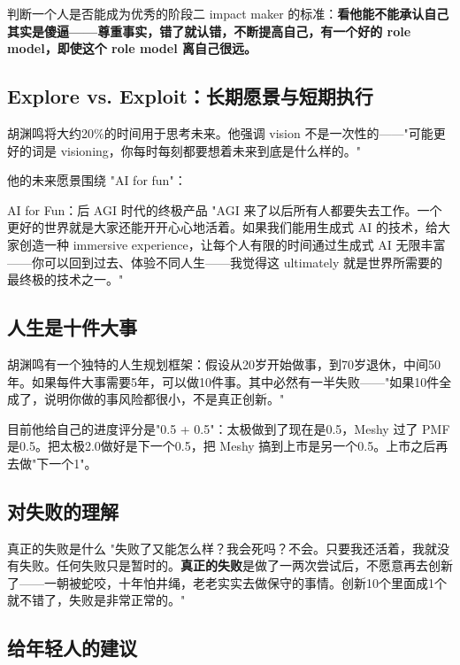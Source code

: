 \documentclass[a4paper]{article}
\begin{document}
判断一个人是否能成为优秀的阶段二 impact maker 的标准：\textbf{看他能不能承认自己其实是傻逼——尊重事实，错了就认错，不断提高自己，有一个好的 role model，即使这个 role model 离自己很远。}

\subsection{Explore vs. Exploit：长期愿景与短期执行}

胡渊鸣将大约20\%的时间用于思考未来。他强调 vision 不是一次性的——"可能更好的词是 visioning，你每时每刻都要想着未来到底是什么样的。"

他的未来愿景围绕 "AI for fun"：

\begin{knowledgebox}{AI for Fun：后 AGI 时代的终极产品}
"AGI 来了以后所有人都要失去工作。一个更好的世界就是大家还能开开心心地活着。如果我们能用生成式 AI 的技术，给大家创造一种 immersive experience，让每个人有限的时间通过生成式 AI 无限丰富——你可以回到过去、体验不同人生——我觉得这 ultimately 就是世界所需要的最终极的技术之一。"
\end{knowledgebox}

\subsection{人生是十件大事}

胡渊鸣有一个独特的人生规划框架：假设从20岁开始做事，到70岁退休，中间50年。如果每件大事需要5年，可以做10件事。其中必然有一半失败——"如果10件全成了，说明你做的事风险都很小，不是真正创新。"

目前他给自己的进度评分是"0.5 + 0.5"：太极做到了现在是0.5，Meshy 过了 PMF 是0.5。把太极2.0做好是下一个0.5，把 Meshy 搞到上市是另一个0.5。上市之后再去做"下一个1"。

\subsection{对失败的理解}

\begin{importantbox}{真正的失败是什么}
"失败了又能怎么样？我会死吗？不会。只要我还活着，我就没有失败。任何失败只是暂时的。\textbf{真正的失败}是做了一两次尝试后，不愿意再去创新了——一朝被蛇咬，十年怕井绳，老老实实去做保守的事情。创新10个里面成1个就不错了，失败是非常正常的。"
\end{importantbox}

\subsection{给年轻人的建议}
\end{document}
